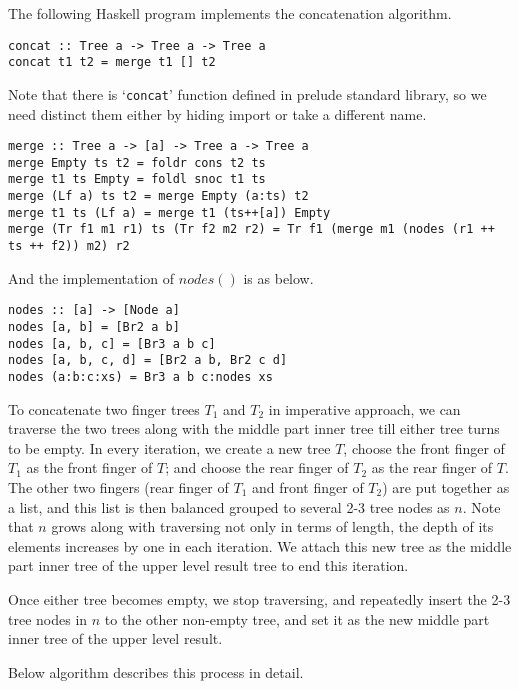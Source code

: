 \documentclass[UTF8]{article}
\begin{document}
The following Haskell program implements the concatenation algorithm.

\lstset{language=Haskell}
\begin{lstlisting}
concat :: Tree a -> Tree a -> Tree a
concat t1 t2 = merge t1 [] t2
\end{lstlisting}

Note that there is `\verb|concat|' function defined in prelude standard library,
so we need distinct them either by hiding import or take a different name.

\begin{lstlisting}
merge :: Tree a -> [a] -> Tree a -> Tree a
merge Empty ts t2 = foldr cons t2 ts
merge t1 ts Empty = foldl snoc t1 ts
merge (Lf a) ts t2 = merge Empty (a:ts) t2
merge t1 ts (Lf a) = merge t1 (ts++[a]) Empty
merge (Tr f1 m1 r1) ts (Tr f2 m2 r2) = Tr f1 (merge m1 (nodes (r1 ++ ts ++ f2)) m2) r2
\end{lstlisting}

And the implementation of $nodes()$ is as below.

\begin{lstlisting}
nodes :: [a] -> [Node a]
nodes [a, b] = [Br2 a b]
nodes [a, b, c] = [Br3 a b c]
nodes [a, b, c, d] = [Br2 a b, Br2 c d]
nodes (a:b:c:xs) = Br3 a b c:nodes xs
\end{lstlisting}

To concatenate two finger trees $T_1$ and $T_2$ in imperative approach, we can traverse the two trees along
with the middle part inner tree till either tree turns to be empty. In every iteration,
we create a new tree $T$, choose the front finger of $T_1$ as the front finger of $T$; and choose the
rear finger of $T_2$ as the rear finger of $T$. The other two fingers (rear finger of $T_1$ and front finger
of $T_2$) are put together as a list, and this list is then balanced grouped to several 2-3 tree nodes as $n$.
Note that $n$ grows along with traversing not only in terms of length, the depth of its elements
increases by one in each iteration. We attach this new tree as the middle part inner tree of the
upper level result tree to end this iteration.

Once either tree becomes empty, we stop traversing, and repeatedly insert the 2-3 tree nodes in $n$ to
the other non-empty tree, and set it as the new middle part inner tree of the upper level result.

Below algorithm describes this process in detail.
\end{document}
